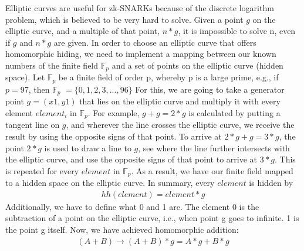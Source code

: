 Elliptic curves are useful for zk-SNARKs because of the discrete logarithm problem, which is believed to be very hard to solve. Given a point \(g\) on the elliptic curve, and a multiple of that point, \(n*g\), it is impossible to solve n, even if \(g\) and \(n*g\) are given. In order to choose an elliptic curve that offers homomorphic hiding, we need to implement a mapping between our known numbers of the finite field \begin{math}\mathbb{F}_p\end{math} and a set of points on the elliptic curve (hidden space). Let \begin{math}\mathbb{F}_p\end{math} be a finite field of order p, whereby p is a large prime, e.g., if \(p=97\), then \begin{math}\mathbb{F}_p\end{math} \(=\{0, 1, 2, 3, ..., 96\}\) For this, we are going to take a generator point \(g = (x1,y1)\) that lies on the elliptic curve and multiply it with every element \({element}_i\) in \begin{math}\mathbb{F}_p\end{math}. For example, \(g + g = 2*g\) is calculated by putting a tangent line on \(g\), and wherever the line crosses the elliptic curve, we receive the result by using the opposite signs of that point. To arrive at \(2*g + g = 3*g\), the point \(2*g\) is used to draw a line to \(g\), see where the line further intersects with the elliptic curve, and use the opposite signs of that point to arrive at \(3*g\). This is repeated for every \(element\) in \begin{math}\mathbb{F}_p\end{math}. As a result, we have our finite field mapped to a hidden space on the elliptic curve. In summary, every \(element\) is hidden by
\begin{align}
    hh(element) = element * g
\end{align}
Additionally, we have to define what 0 and 1 are. The element 0 is the subtraction of a point on the elliptic curve, i.e., when point g goes to infinite. 1 is the point g itself.
Now, we have achieved homomorphic addition:
\begin{align}
    (A + B) \longrightarrow (A + B) * g = A*g + B*g
\end{align}

